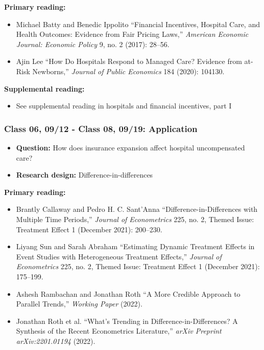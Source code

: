 \documentclass[11pt,]{article}
\providecommand{\tightlist}{%
  \setlength{\itemsep}{0pt}\setlength{\parskip}{0pt}}
\begin{document}
\textbf{Primary reading:}

\begin{itemize}
\tightlist
\item
  Michael Batty and Benedic Ippolito {``Financial Incentives, Hospital
  Care, and Health Outcomes: {Evidence} from Fair Pricing Laws,''}
  \emph{American Economic Journal: Economic Policy} 9, no. 2 (2017):
  28--56.
\item
  Ajin Lee {``How Do Hospitals Respond to Managed Care? {Evidence} from
  at-Risk Newborns,''} \emph{Journal of Public Economics} 184 (2020):
  104130.
\end{itemize}

\textbf{Supplemental reading:}

\begin{itemize}
\tightlist
\item
  See supplemental reading in hospitals and financial incentives, part I
\end{itemize}

\hypertarget{class-06-0912---class-08-0919-application}{%
\subsubsection{Class 06, 09/12 - Class 08, 09/19:
Application}\label{class-06-0912---class-08-0919-application}}

\begin{itemize}
\tightlist
\item
  \textbf{Question:} How does insurance expansion affect hospital
  uncompensated care?
\item
  \textbf{Research design:} Difference-in-differences
\end{itemize}

\textbf{Primary reading:}

\begin{itemize}
\tightlist
\item
  Brantly Callaway and Pedro H. C. Sant'Anna
  {``Difference-in-{Differences} with Multiple Time Periods,''}
  \emph{Journal of Econometrics} 225, no. 2, Themed {Issue}: {Treatment}
  {Effect} 1 (December 2021): 200--230.
\item
  Liyang Sun and Sarah Abraham {``Estimating Dynamic Treatment Effects
  in Event Studies with Heterogeneous Treatment Effects,''}
  \emph{Journal of Econometrics} 225, no. 2, Themed {Issue}: {Treatment}
  {Effect} 1 (December 2021): 175--199.
\item
  Ashesh Rambachan and Jonathan Roth {``A {More} {Credible} {Approach}
  to {Parallel} {Trends},''} \emph{Working Paper} (2022).
\item
  Jonathan Roth et al. {``What's {Trending} in
  {Difference}-in-{Differences}? {A} {Synthesis} of the {Recent}
  {Econometrics} {Literature},''} \emph{arXiv Preprint arXiv:2201.01194}
  (2022).
\end{itemize}
\end{document}
